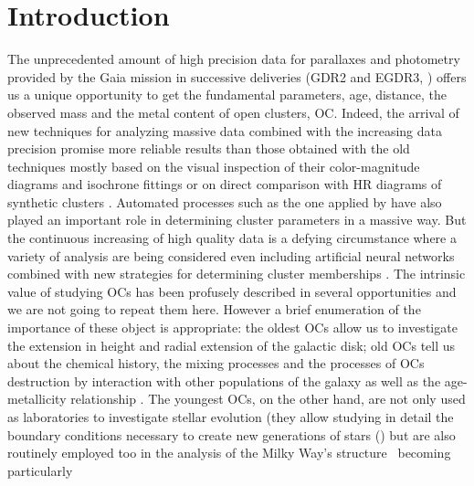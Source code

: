 \documentclass{aa}
\begin{document}

\maketitle


\section{Introduction}

 The unprecedented amount of high precision data for parallaxes and photometry provided by the Gaia mission in successive deliveries (GDR2 and EGDR3, \cite{Gaia_2016,Gaia_EDR3}) offers us a unique opportunity to get the fundamental parameters, age, distance, the observed mass and the metal content of open clusters, OC. Indeed, the arrival of new techniques for analyzing massive data 
 combined with the increasing data precision promise more reliable results than those obtained with the old techniques mostly based on the visual inspection of their color-magnitude diagrams and isochrone fittings \citep{Phelps1994} or on direct comparison with HR diagrams of synthetic clusters \citep{Siess1997}. Automated processes such as the one applied by \cite{Kharchenko_2012} have also played an important role in determining cluster parameters in a massive way. But the continuous increasing of high quality data is a defying circumstance where a variety of analysis are being considered even including artificial neural networks \citep{Cantat_2020} combined with new strategies for determining cluster memberships \citep{Krone2014,Cantat2018}. The intrinsic value of studying OCs has been profusely described in several opportunities and we are not going to repeat them here. However a brief enumeration of the importance of these object is appropriate: the oldest OCs allow us to investigate the extension in height and radial extension of the galactic disk; old OCs tell us about the chemical history, the mixing processes and the processes of OCs destruction by interaction with other populations of the galaxy as well as the age-metallicity relationship \citep{Friel1995,Tosi2004,Hayes2015}. The youngest OCs, on the other hand, are not only used as laboratories to investigate stellar evolution (they allow studying in detail the boundary conditions necessary to create new generations of stars (\citep{Lada2003}) but are also routinely employed too in the analysis of the Milky Way's structure~\citep{Loktin_1992,Moitinho_2006,Vazquez2008,Moitinho_2010} becoming particularly
\end{document}

